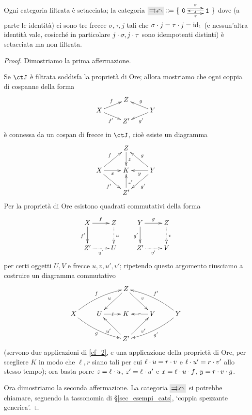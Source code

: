 \begin{theorem}\label{ex_set_nonfiltr}
 Ogni categoria filtrata è setacciata; la categoria
 \(\genRG\defeq\big\{\xymatrix{\texttt{0} \ar@<.4em>[r]^-\sigma\ar@<-.4em>[r]_-\tau & \texttt{1}\ar[l]|j}\big\}\)
 dove (a parte le identità) ci sono tre frecce \(\sigma,\tau,j\) tali che \(\sigma\cdot j = \tau\cdot j = \mathrm{id}_1\) (e nessun'altra identità vale, cosicché in particolare \(j\cdot\sigma,j\cdot \tau\) sono idempotenti distinti) è setacciata ma non filtrata.
\end{theorem}
\begin{proof}
 Dimostriamo la prima affermazione.

 Se \(\ctJ\) è filtrata soddisfa la proprietà di Ore; allora mostriamo che ogni coppia di cospanne della forma
 \[\xymatrix@R=1mm{
  &Z  & \\
  X \ar[dr]_{f'}\ar[ur]^f&& Y\ar[ul]_g\ar[dl]^{g'}\\
  & Z'
  }\]
 è connessa da un cospan di frecce in \(\ctJ\), cioè esiste un diagramma
 \[\xymatrix@R=7mm{
  &Z\ar[d]^z & \\
  X \ar[r]_x \ar[dr]_{f'}\ar[ur]^f& K & Y\ar[ul]_g\ar[dl]^{g'}\ar[l]^y\\
  & Z'\ar[u]_{z'}
  }\]
 Per la proprietà di Ore esistono quadrati commutativi della forma
 \[\xymatrix{
   X \ar[r]^f\ar[d]_{f'}& Z\ar@{.>}[d]^u & Y \ar[r]^g\ar[d]_{g'}& Z\ar@{.>}[d]^v\\
   Z' \ar@{.>}[r]_{u'} & U & Z' \ar@{.>}[r]_{v'}& V
  }\]
 per certi oggetti \(U,V\) e frecce \(u,v,u',v'\); ripetendo questo argomento riusciamo a costruire un diagramma commutativo
 \[
  \xymatrix{
  &  & Z \ar@{->}[ld]_{u} \ar@{->}[rd]^{v} &  &  \\
  X \ar@/^/@{->}[rru]^{f} \ar@/_/@{->}[rrd]_{g} & U \ar@{->}[r]|-{\ell} & K & V \ar@{->}[l]|-{r} & Y \ar@/_/@{->}[llu]_{f'} \ar@/^/@{->}[lld]^{g'} \\
  &  & Z' \ar@{->}[lu]^{u'} \ar@{->}[ru]_{v'} &  &
  }
 \]
 (servono due applicazioni di \ref{cf_2}, e una applicazione della proprietà di Ore, per scegliere \(K\) in modo che \(\ell,r\) siano tali per cui \(\ell\cdot u = r\cdot v\) e \(\ell\cdot u' = r\cdot v'\) allo stesso tempo); ora basta porre \(z = \ell\cdot u \), \(z' =	\ell\cdot u'\) e \(x = \ell\cdot u\cdot f\), \(y = r\cdot v\cdot g\).

 Ora dimostriamo la seconda affermazione. La categoria \(\genRG\) si potrebbe chiamare, seguendo la tassonomia di §\ref{sec_esempi_cats}, `coppia spezzante generica'.


\end{proof}
